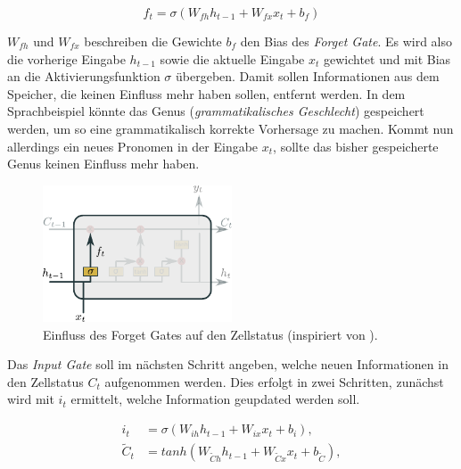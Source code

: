             \begin{equation}
                f_t = \sigma\left(W_{fh}h_{t-1} + W_{fx}x_t + b_f\right)
            \end{equation}

            $W_{fh}$ und $W_{fx}$ beschreiben die Gewichte $b_f$ den Bias des \textit{Forget Gate}.
            Es wird also die vorherige Eingabe $h_{t-1}$ sowie die aktuelle Eingabe $x_t$ gewichtet und mit Bias an die Aktivierungsfunktion $\sigma$ übergeben.
            Damit sollen Informationen aus dem Speicher, die keinen Einfluss mehr haben sollen, entfernt werden.
            In dem Sprachbeispiel könnte das Genus (\textit{grammatikalisches Geschlecht}) gespeichert werden, um so eine grammatikalisch korrekte Vorhersage zu machen.
            Kommt nun allerdings ein neues Pronomen in der Eingabe $x_t$, sollte das bisher gespeicherte Genus keinen Einfluss mehr haben.
            
                \begin{figure}[h]
                    \centering
                    \includegraphics[width=0.5\textwidth]{images/Illustrationen/LSTM_FG}
                    \caption{Einfluss des Forget Gates auf den Zellstatus (inspiriert von \cite{OLAH2015}).}
                    \label{fig:LSTM_Forget}
                \end{figure}
                
            Das \textit{Input Gate} soll im nächsten Schritt angeben, welche neuen Informationen in den Zellstatus $C_t$ aufgenommen werden.
            Dies erfolgt in zwei Schritten, zunächst wird mit $i_t$ ermittelt, welche Information geupdated werden soll.

            \begin{equation}
                \begin{split}
                    i_t &= \sigma\left(W_{ih}h_{t-1} + W_{ix}x_t + b_i\right), \\
                    \tilde{C}_t &= tanh\left(W_{\tilde{C}h}h_{t-1} + W_{\tilde{C}x}x_t + b_{\tilde{C}}\right),\\
                \end{split}
            \end{equation}


